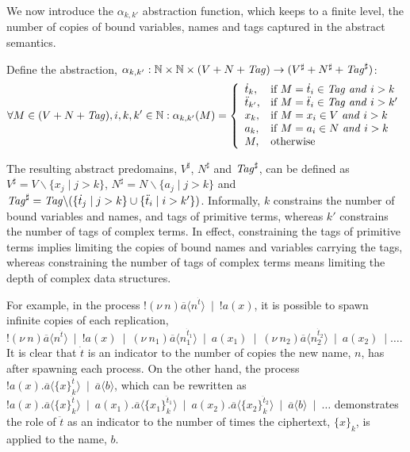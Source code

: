 \documentclass[10pt,a4paper,final,oneside,fleqn]{book}
\begin{document}
We now introduce the $\alpha_{k,k'}$ abstraction function, which keeps to a finite level, the number of copies of bound variables, names and tags captured in the abstract semantics.
\begin{defn}
Define the abstraction, $\alpha_{k,k'}:\mathbb{N}\times\mathbb{N}\times(V+N+\mbox{{\itshape Tag\/}})\to(V^\sharp+N^\sharp+\mbox{{\itshape Tag\/}}^\sharp)$:
\begin{equation*}
\forall M\in(V+N+\mbox{{\itshape Tag\/}}),i,k,k'\in\mathbb{N}:\alpha_{k,k'}(M)=\left\{\begin{array}{ll}
\dot{t}_{k},&\mbox{if }M=\dot{t}_i\in\mbox{{\itshape Tag\/}}\mbox{ {\itshape and\/} }i>k\\
\ddot{t}_{k'},&\mbox{if }M=\ddot{t}_i\in\mbox{{\itshape Tag\/}}\mbox{ {\itshape and\/} }i>k'\\
x_{k},&\mbox{if }M=x_i\in V\mbox{ {\itshape and\/} }i>k\\
a_{k},&\mbox{if }M=a_i\in N\mbox{ {\itshape and\/} }i>k\\
M,&\mbox{otherwise}
\end{array}\right.
\end{equation*}
\end{defn}
The resulting abstract predomains, $V^\sharp$, $N^\sharp$ and $\mbox{{\itshape Tag\/}}^\sharp$, can be defined as $V^\sharp=V\backslash\{x_j\mid j>k\}$, $N^\sharp=N\backslash\{a_j\mid j>k\}$ and $\mbox{{\itshape Tag\/}}^\sharp=\mbox{{\itshape Tag\/}}\backslash(\{\dot{t}_{j}\mid j>k\}\cup\{\ddot{t}_{i}\mid i>k'\})$.  Informally, $k$ constrains the number of bound variables and names, and tags of primitive terms, whereas $k'$ constrains the number of tags of complex terms.  In effect, constraining the tags of primitive terms implies limiting the copies of bound names and variables carrying the tags, whereas constraining the number of tags of complex terms means limiting the depth of complex data structures.

For example, in the process $!(\nu~\!n)\overline{a}\langle n^{\dot{t}}\rangle~\mid~!a(x)$, it is possible to spawn infinite copies of each replication, $!(\nu~\!n)\overline{a}\langle n^{\dot{t}}\rangle~\mid~!a(x)~\mid~(\nu~\!n_1)\overline{a}\langle n_1^{\dot{t}_1}\rangle~\mid~a(x_1)~\mid~(\nu~\!n_2)\overline{a}\langle n_2^{\dot{t}_2}\rangle~\mid~a(x_2)~\mid\ldots$.  It is clear that $\dot{t}$ is an indicator to the number of copies the new name, $n$, has after spawning each process.  On the other hand, the process $!a(x).\overline{a}\langle\{x\}_k^{\ddot{t}}\rangle~\mid~\overline{a}\langle b\rangle$, which can be rewritten as $!a(x).\overline{a}\langle\{x\}_k^{\ddot{t}}\rangle~\mid~a(x_1).\overline{a}\langle\{x_1\}_k^{\ddot{t}_1}\rangle~\mid~a(x_2).\overline{a}\langle\{x_2\}_k^{\ddot{t}_2}\rangle~\mid~\overline{a}\langle b\rangle~\mid~\ldots$ demonstrates the role of $\ddot{t}$ as an indicator to the number of times the ciphertext, $\{x\}_k$, is applied to the name, $b$.
\end{document}
